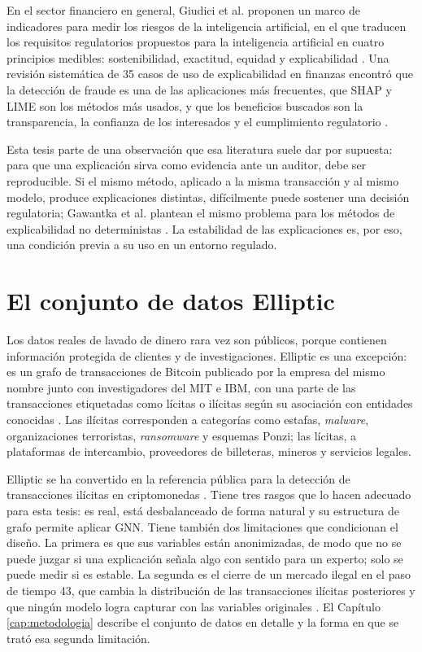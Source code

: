 En el sector financiero en general, Giudici et al. proponen un marco de indicadores para
medir los riesgos de la inteligencia artificial, en el que traducen los requisitos regulatorios
propuestos para la inteligencia artificial en cuatro principios medibles: sostenibilidad,
exactitud, equidad y explicabilidad \cite{Giudici2023Risk}. Una revisión sistemática de 35
casos de uso de explicabilidad en finanzas encontró que la detección de fraude es una de las
aplicaciones más frecuentes, que SHAP y LIME son los métodos más usados, y que los beneficios
buscados son la transparencia, la confianza de los interesados y el cumplimiento regulatorio
\cite{FinXAI2026Mapping}.

Esta tesis parte de una observación que esa literatura suele dar por supuesta: para que una
explicación sirva como evidencia ante un auditor, debe ser reproducible. Si el mismo método, aplicado a la misma transacción y al mismo modelo, produce explicaciones distintas, difícilmente puede sostener una decisión regulatoria; Gawantka et al. plantean el mismo problema para los métodos de explicabilidad no deterministas \cite{Gawantka2024Explanations}. La estabilidad de las explicaciones es,
por eso, una condición previa a su uso en un entorno regulado.

\section{El conjunto de datos Elliptic}\label{sec:ctx_elliptic}

Los datos reales de lavado de dinero rara vez son públicos, porque contienen información
protegida de clientes y de investigaciones. Elliptic es una excepción: es un grafo de
transacciones de Bitcoin publicado por la empresa del mismo nombre junto con investigadores del
MIT e IBM, con una parte de las transacciones etiquetadas como lícitas o ilícitas según su
asociación con entidades conocidas \cite{Weber2019Elliptic}. Las ilícitas corresponden a
categorías como estafas, \textit{malware}, organizaciones terroristas, \textit{ransomware} y
esquemas Ponzi; las lícitas, a plataformas de intercambio, proveedores de billeteras, mineros y
servicios legales.

Elliptic se ha convertido en la referencia pública para la detección de transacciones
ilícitas en criptomonedas \cite{Alarab2023Graph, DTA2022Evolving}. Tiene tres rasgos que lo
hacen adecuado para esta tesis: es real, está desbalanceado de forma natural y su estructura de
grafo permite aplicar GNN. Tiene también dos limitaciones que condicionan el diseño. La primera es
que sus variables están anonimizadas, de modo que no se puede juzgar si una explicación señala
algo con sentido para un experto; solo se puede medir si es estable. La segunda es el cierre de
un mercado ilegal en el paso de tiempo 43, que cambia la distribución de las transacciones
ilícitas posteriores y que ningún modelo logra capturar con las variables originales
\cite{Weber2019Elliptic, Alarab2023Recurrent}. El Capítulo \ref{cap:metodologia} describe el
conjunto de datos en detalle y la forma en que se trató esa segunda limitación.
